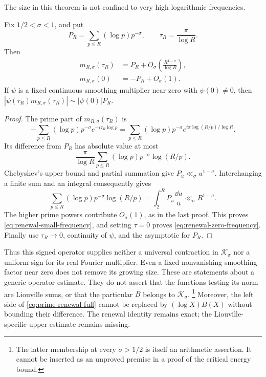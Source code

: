 The size in this theorem is not confined to very high logarithmic
frequencies.

\begin{proposition}
\label{prop:renewal-low-frequency}
Fix $1/2<\sigma<1$, and put
\[
 P_R=\sum_{p\le R}(\log p)p^{-\sigma},\qquad
 \tau_R=\frac\pi{\log R}.
\]
Then
\begin{align}
 m_{R,\sigma}(\tau_R)
   &=P_R+O_\sigma\!\left(\frac{R^{1-\sigma}}{\log R}\right),
       \label{eq:renewal-small-frequency}\\
 m_{R,\sigma}(0)&=-P_R+O_\sigma(1).
       \label{eq:renewal-zero-frequency}
\end{align}
If $\psi$ is a fixed continuous smoothing multiplier near zero with
$\psi(0)\ne0$, then
$|\psi(\tau_R)m_{R,\sigma}(\tau_R)|\sim|\psi(0)|P_R$.
\end{proposition}
\begin{proof}
The prime part of $m_{R,\sigma}(\tau_R)$ is
\[
 -\sum_{p\le R}(\log p)p^{-\sigma}e^{-i\tau_R\log p}
 =\sum_{p\le R}(\log p)p^{-\sigma}
           e^{i\pi\log(R/p)/\log R}.
\]
Its difference from $P_R$ has absolute value at most
\[
 \frac\pi{\log R}\sum_{p\le R}
             (\log p)p^{-\sigma}\log(R/p).
\]
Chebyshev's upper bound and partial summation give
$P_u\ll_\sigma u^{1-\sigma}$. Interchanging a finite sum and an
integral consequently gives
\[
 \sum_{p\le R}(\log p)p^{-\sigma}\log(R/p)
   =\int_2^R P_u\frac{\dd u}u\ll_\sigma R^{1-\sigma}.
\]
The higher prime powers contribute $O_\sigma(1)$, as in the last
proof. This proves \eqref{eq:renewal-small-frequency}, and setting
$\tau=0$ proves \eqref{eq:renewal-zero-frequency}. Finally use
$\tau_R\to0$, continuity of $\psi$, and the asymptotic for $P_R$.
\end{proof}

Thus this signed operator supplies neither a universal contraction
in $\mathcal K_\sigma$ nor a uniform sign for its real Fourier
multiplier. Even a fixed nonvanishing smoothing factor near zero
does not remove its growing size. These are statements about a
generic operator estimate. They do not assert that the functions
testing its norm are Liouville sums, or that the particular $B$
belongs to $\mathcal K_\sigma$.
\footnote{The latter membership at every $\sigma>1/2$ is itself an
arithmetic assertion. It cannot be inserted as an unproved premise
in a proof of the critical energy bound.}
Moreover, the left side of \eqref{eq:prime-renewal-full} cannot be
replaced by $(\log X)B(X)$ without bounding their difference.
The renewal identity remains exact; the Liouville-specific upper
estimate remains missing.
